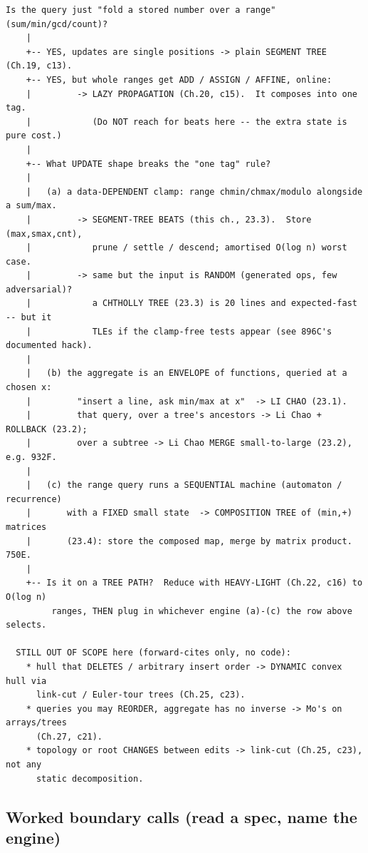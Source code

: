 \begin{lstlisting}[language={}, basicstyle=\ttfamily\small, numbers=none, frame=single,
  caption={Decision ladder for the advanced-array family. Read top to bottom, stop at the first line that matches. Hands off to Chapters 19/20/21/22 whenever a plainer engine already owns the cell.}, label={lst:c29-map}]
  Is the query just "fold a stored number over a range" (sum/min/gcd/count)?
    |
    +-- YES, updates are single positions -> plain SEGMENT TREE (Ch.19, c13).
    +-- YES, but whole ranges get ADD / ASSIGN / AFFINE, online:
    |         -> LAZY PROPAGATION (Ch.20, c15).  It composes into one tag.
    |            (Do NOT reach for beats here -- the extra state is pure cost.)
    |
    +-- What UPDATE shape breaks the "one tag" rule?
    |
    |   (a) a data-DEPENDENT clamp: range chmin/chmax/modulo alongside a sum/max.
    |         -> SEGMENT-TREE BEATS (this ch., 23.3).  Store (max,smax,cnt),
    |            prune / settle / descend; amortised O(log n) worst case.
    |         -> same but the input is RANDOM (generated ops, few adversarial)?
    |            a CHTHOLLY TREE (23.3) is 20 lines and expected-fast -- but it
    |            TLEs if the clamp-free tests appear (see 896C's documented hack).
    |
    |   (b) the aggregate is an ENVELOPE of functions, queried at a chosen x:
    |         "insert a line, ask min/max at x"  -> LI CHAO (23.1).
    |         that query, over a tree's ancestors -> Li Chao + ROLLBACK (23.2);
    |         over a subtree -> Li Chao MERGE small-to-large (23.2), e.g. 932F.
    |
    |   (c) the range query runs a SEQUENTIAL machine (automaton / recurrence)
    |       with a FIXED small state  -> COMPOSITION TREE of (min,+) matrices
    |       (23.4): store the composed map, merge by matrix product. 750E.
    |
    +-- Is it on a TREE PATH?  Reduce with HEAVY-LIGHT (Ch.22, c16) to O(log n)
         ranges, THEN plug in whichever engine (a)-(c) the row above selects.

  STILL OUT OF SCOPE here (forward-cites only, no code):
    * hull that DELETES / arbitrary insert order -> DYNAMIC convex hull via
      link-cut / Euler-tour trees (Ch.25, c23).
    * queries you may REORDER, aggregate has no inverse -> Mo's on arrays/trees
      (Ch.27, c21).
    * topology or root CHANGES between edits -> link-cut (Ch.25, c23), not any
      static decomposition.
\end{lstlisting}

\subsection{Worked boundary calls (read a spec, name the engine)}

